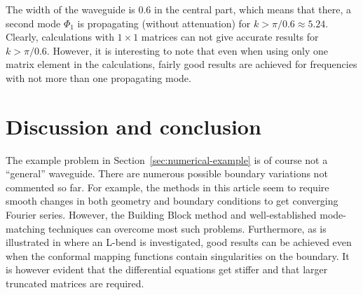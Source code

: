 \documentclass[numreferences]{kluwer}
\renewcommand{\Phi}{\varPhi}
\renewcommand{\Re}{\operatorname{Re}}
\renewcommand{\Phi}{\varPhi}
\begin{document}
The width of the waveguide is $0.6$ in the central part, which means
that there, a second mode $\Phi_1$ is propagating (without
attenuation) for $k>\pi/0.6\approx5.24$. Clearly, calculations with
$1\times1$ matrices can not give accurate results for $k>\pi/0.6$.
However, it is interesting to note that even when using only one
matrix element in the calculations, fairly good results are achieved
for frequencies with not more than one propagating mode.







\section{Discussion and conclusion}
\label{sec:conclusion}

The example problem in Section~\ref{sec:numerical-example} is of
course not a ``general'' wave\-guide. There are numerous possible
boundary variations not commented so far. For example, the methods in
this article seem to require smooth changes in both geometry and
boundary conditions to get converging Fourier series. However, the
Building Block method and well-established mode-matching techniques
can overcome most such problems. Furthermore, as is illustrated in
\cite{Nilsson:2002} where an L-bend is investigated, good results can
be achieved even when the conformal mapping functions contain
singularities on the boundary. It is however evident that the
differential equations get stiffer and that larger truncated matrices
are required.
\end{document}
